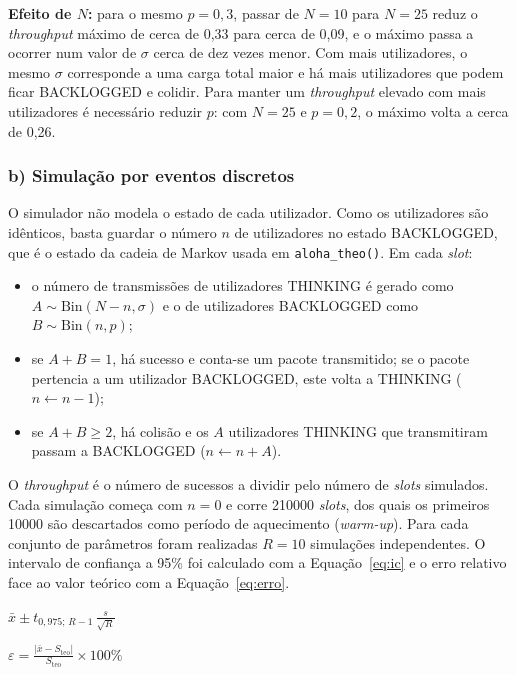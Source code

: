 \documentclass[10pt,a4paper]{article}
\newcommand{\formula}[3]{\begin{equacao}[H]\centering$\displaystyle #1$\caption{#2}\label{#3}\end{equacao}}
\begin{document}
\newpage

\textbf{Efeito de $N$:} para o mesmo $p=0{,}3$, passar de $N=10$ para $N=25$ reduz o \textit{throughput} máximo de cerca de 0,33 para cerca de 0,09, e o máximo passa a ocorrer num valor de $\sigma$ cerca de dez vezes menor. Com mais utilizadores, o mesmo $\sigma$ corresponde a uma carga total maior e há mais utilizadores que podem ficar BACKLOGGED e colidir. Para manter um \textit{throughput} elevado com mais utilizadores é necessário reduzir $p$: com $N=25$ e $p=0{,}2$, o máximo volta a cerca de 0,26.

\subsubsection*{b) Simulação por eventos discretos}

O simulador não modela o estado de cada utilizador. Como os utilizadores são idênticos, basta guardar o número $n$ de utilizadores no estado BACKLOGGED, que é o estado da cadeia de Markov usada em \texttt{aloha\_theo()}. Em cada \textit{slot}:
\begin{itemize}
  \item o número de transmissões de utilizadores THINKING é gerado como $A\sim\mathrm{Bin}(N-n,\sigma)$ e o de utilizadores BACKLOGGED como $B\sim\mathrm{Bin}(n,p)$;
  \item se $A+B=1$, há sucesso e conta-se um pacote transmitido; se o pacote pertencia a um utilizador BACKLOGGED, este volta a THINKING ($n\leftarrow n-1$);
  \item se $A+B\geq2$, há colisão e os $A$ utilizadores THINKING que transmitiram passam a BACKLOGGED ($n\leftarrow n+A$).
\end{itemize}
O \textit{throughput} é o número de sucessos a dividir pelo número de \textit{slots} simulados. Cada simulação começa com $n=0$ e corre \num{210000} \textit{slots}, dos quais os primeiros \num{10000} são descartados como período de aquecimento (\textit{warm-up}). Para cada conjunto de parâmetros foram realizadas $R=10$ simulações independentes. O intervalo de confiança a 95\% foi calculado com a Equação~\ref{eq:ic} e o erro relativo face ao valor teórico com a Equação~\ref{eq:erro}.

\formula{\bar{x}\pm t_{0{,}975;\,R-1}\,\frac{s}{\sqrt{R}}}{Intervalo de confiança a 95\% ($\bar{x}$: média e $s$: desvio padrão das $R$ simulações; $t$: quantil da distribuição \textit{t} de Student).}{eq:ic}

\formula{\varepsilon=\frac{\lvert \bar{x}-S_{\mathrm{teo}}\rvert}{S_{\mathrm{teo}}}\times100\%}{Erro relativo do \textit{throughput} simulado face ao teórico.}{eq:erro}
\end{document}
